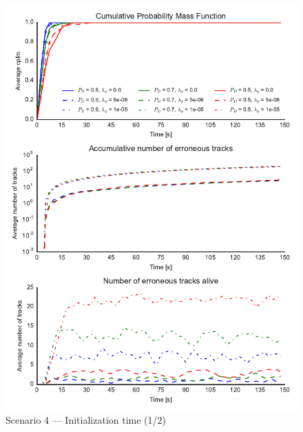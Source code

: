 \begin{figure}
\centering
\includegraphics{Figures/plots/Scenario4_Init-Time(1-2).pdf}
\caption{Scenario 4 --- Initialization time (1/2)}\label{fig:init4_time_1-2}
\end{figure}

